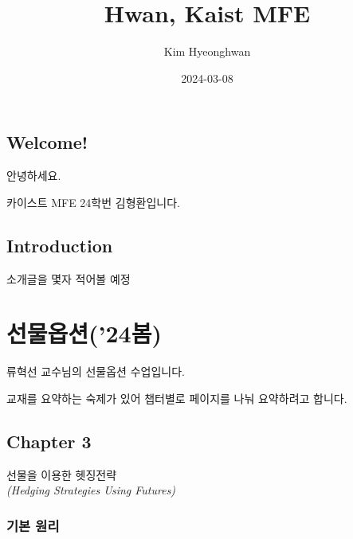 \documentclass[
  letterpaper,
  DIV=11,
  numbers=noendperiod]{scrreprt}
\title{Hwan, Kaist MFE}
\author{Kim Hyeonghwan}
\date{2024-03-08}
\renewcommand*\contentsname{Table of contents}
\newcommand\contentsname{Table of contents}
\begin{document}
\maketitle

\renewcommand*\contentsname{Table of contents}
{
\hypersetup{linkcolor=}
\setcounter{tocdepth}{2}
\tableofcontents
}

\chapter*{Welcome!}\label{welcome}


안녕하세요.

카이스트 MFE 24학번 김형환입니다.


\chapter*{Introduction}\label{introduction}


소개글을 몇자 적어볼 예정

\part{선물옵션('24봄)}

류혁선 교수님의 선물옵션 수업입니다.

교재를 요약하는 숙제가 있어 챕터별로 페이지를 나눠 요약하려고 합니다.

\chapter*{Chapter 3}\label{chapter-3}


선물을 이용한 헷징전략\\
\emph{(Hedging Strategies Using Futures)}

\section*{기본 원리}\label{uxae30uxbcf8-uxc6d0uxb9ac}

\end{document}
